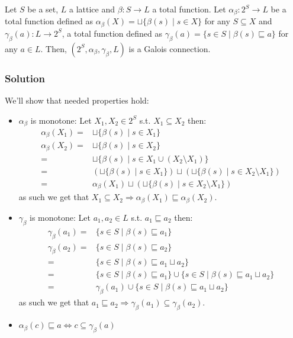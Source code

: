 Let $S$ be a set, $L$ a lattice and $\beta:S \rightarrow L$ a total function. Let $\alpha_\beta:2^S\rightarrow L$ be a total function defined as $\alpha_\beta(X)=\sqcup\{\beta(s)\mid s\in X\}$ for any $S \subseteq X$ and $\gamma_\beta(a):L\rightarrow 2^S$, a total function defined as $\gamma_\beta(a)=\{s\in S\mid \beta(s)\sqsubseteq a\}$ for any $a \in L$. Then,  $(2^S, \alpha_\beta, \gamma_\beta, L)$ is a Galois connection.

\subsubsection*{Solution}
We'll show that needed properties hold:
\begin{itemize}
	\item $\alpha_\beta$ is monotone: Let $X_1,X_2\in 2^S$ s.t. $X_1 \subseteq X_2$ then:
	\begin{align*}
		\alpha_\beta(X_1) =& \sqcup \{\beta(s) \mid s \in X_1\} \\
		\alpha_\beta(X_2) =& \sqcup \{\beta(s) \mid s \in X_2\} \\
					=& \sqcup \{\beta(s) \mid s \in X_1 \cup (X_2 \setminus X_1)\} \\
					=& (\sqcup \{\beta(s) \mid s \in X_1\}) \sqcup (\sqcup \{\beta(s) \mid s \in X_2 \setminus X_1\}) \\
					=& \alpha_\beta(X_1) \sqcup (\sqcup \{\beta(s) \mid s \in X_2 \setminus X_1\})
	\end{align*}
	as such we get that $X_1 \subseteq X_2 \Rightarrow \alpha_\beta(X_1) \sqsubseteq \alpha_\beta(X_2)$.
	\item $\gamma_\beta$ is monotone: Let $a_1,a_2 \in L$ s.t. $a_1 \sqsubseteq a_2$ then:
	\begin{align*}
		\gamma_\beta(a_1) =& \{ s \in S \mid \beta(s) \sqsubseteq a_1 \} \\
		\gamma_\beta(a_2) =& \{ s \in S \mid \beta(s) \sqsubseteq a_2 \} \\
					=& \{ s \in S \mid \beta(s) \sqsubseteq a_1 \sqcup a_2 \} \\
					=& \{ s \in S \mid \beta(s) \sqsubseteq a_1 \} \cup \{ s \in S \mid \beta(s) \sqsubseteq a_1 \sqcup a_2 \} \\
					=& \gamma_\beta(a_1) \cup \{ s \in S \mid \beta(s) \sqsubseteq a_1 \sqcup a_2 \}
	\end{align*}
	as such we get that $a_1 \sqsubseteq a_2 \Rightarrow \gamma_\beta(a_1) \subseteq \gamma_\beta(a_2)$.
	\item $\alpha_\beta(c) \sqsubseteq a \iff c \subseteq \gamma_\beta(a)$

\end{itemize}
